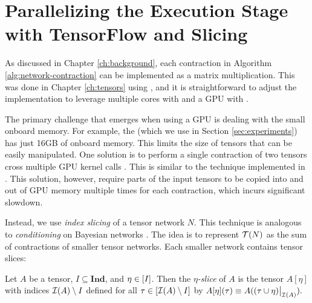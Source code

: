 \section{Parallelizing the Execution Stage with TensorFlow and Slicing}
\label{sec:parallel:execution}
As discussed in Chapter \ref{ch:background}, each contraction in Algorithm \ref{alg:network-contraction} can be implemented as a matrix multiplication.
This was done in Chapter \ref{ch:tensors} using  \cite{numpy}, and it is straightforward to adjust the implementation to leverage multiple cores with  and a GPU with  \cite{ABCCDDDGII16}.

The primary challenge that emerges when using a GPU is dealing with the small onboard memory. For example, the  (which we use in Section \ref{sec:experiments}) has just 16GB of onboard memory. This limits the size of tensors that can be easily manipulated. One solution is to perform a single contraction of two tensors cross multiple GPU kernel calls \cite{RRBSKH08}. This is similar to the technique implemented in  \cite{FHZ19}. This solution, however, require parts of the input tensors to be copied into and out of GPU memory multiple times for each contraction, which incurs significant slowdown.

Instead, we use \emph{index slicing} \cite{CZHNS18,GK20,VBNHRBM19} of a tensor network $N$. This technique is analogous to \emph{conditioning} on Bayesian networks \cite{darwiche01,dechter99,pearl86,SAS94}. The idea is to represent $\mathcal{T}(N)$ as the sum of contractions of smaller tensor networks. Each smaller network contains tensor slices:

\begin{definition}
Let $A$ be a tensor, $I \subseteq \textbf{Ind}$, and $\eta \in [I]$. Then the \emph{$\eta$-slice} of $A$ is the tensor $A[\eta]$ with indices $\mathcal{I}(A) \setminus I$ defined for all $\tau \in [\mathcal{I}(A) \setminus I]$ by $A[\eta](\tau) \equiv A((\tau \cup \eta)\big|_{\mathcal{I}(A)}).$
\end{definition}

